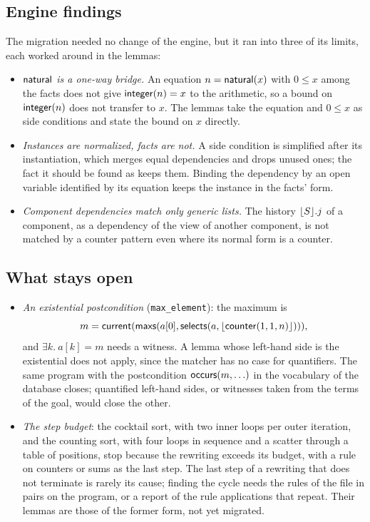 \subsection{Engine findings}\label{sec:open:arith}
The migration needed no change of the engine, but it ran into three of its limits, each worked around in the lemmas:
\begin{itemize}[nosep]
\item \emph{$\mathsf{natural}$ is a one-way bridge.} An equation $n = \mathsf{natural}(x)$ with $0 \le x$ among the facts does not give
  $\mathsf{integer}(n) = x$ to the arithmetic, so a bound on $\mathsf{integer}(n)$ does not transfer to $x$. The lemmas take the equation
  and $0 \le x$ as side conditions and state the bound on $x$ directly.
\item \emph{Instances are normalized, facts are not.} A side condition is simplified after its instantiation, which
  merges equal dependencies and drops unused ones; the fact it should be found as keeps them. Binding the dependency
  by an open variable identified by its equation keeps the instance in the facts' form.
\item \emph{Component dependencies match only generic lists.} The history $\lfloor S\rfloor.j$ of a component, as a dependency
  of the view of another component, is not matched by a counter pattern even where its normal form is a counter.
\end{itemize}

\subsection{What stays open}\label{sec:open:other}
\begin{itemize}[nosep]
\item \emph{An existential postcondition} (\texttt{max\_element}): the maximum is
  \[ m = \mathsf{current}(\mathsf{maxs}(a[0], \mathsf{selects}(a, \lfloor \mathsf{counter}(1, 1, n)\rfloor))), \]
  and $\exists k.\ a[k] = m$ needs a witness. A
  lemma whose left-hand side is the existential does not apply, since the matcher has no case for quantifiers. The
  same program with the postcondition $\mathsf{occurs}(m, \ldots)$ in the vocabulary of the database closes; quantified
  left-hand sides, or witnesses taken from the terms of the goal, would close the other.
\item \emph{The step budget}: the cocktail sort, with two inner loops per outer iteration, and the counting sort, with
  four loops in sequence and a scatter through a table of positions, stop because the rewriting exceeds its budget,
  with a rule on counters or sums as the last step. The last step of a rewriting that does not terminate is rarely its
  cause; finding the cycle needs the rules of the file in pairs on the program, or a report of the rule applications
  that repeat. Their lemmas are those of the former form, not yet migrated.
\end{itemize}
